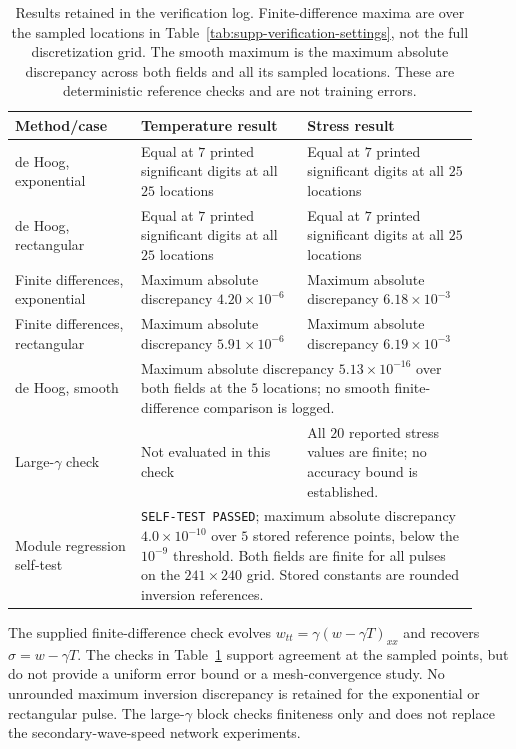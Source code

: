 \documentclass[11pt]{article}
\begin{document}
\begin{table}[htbp]
\centering
\caption{Results retained in the verification log. Finite-difference
maxima are over the sampled locations in
Table~\ref{tab:supp-verification-settings}, not the full discretization
grid. The smooth maximum is the maximum absolute discrepancy across
both fields and all its sampled locations. These are deterministic
reference checks and are not training errors.}
\label{tab:supp-verification-results}
\begin{tabular}{@{}p{0.25\linewidth}p{0.33\linewidth}p{0.34\linewidth}@{}}
\toprule
Method/case & Temperature result & Stress result\\
\midrule
de Hoog, exponential & Equal at $7$ printed significant digits at all
$25$ locations & Equal at $7$ printed significant digits at all
$25$ locations\\
de Hoog, rectangular & Equal at $7$ printed significant digits at all
$25$ locations & Equal at $7$ printed significant digits at all
$25$ locations\\
Finite differences, exponential &
Maximum absolute discrepancy $4.20\times10^{-6}$ &
Maximum absolute discrepancy $6.18\times10^{-3}$\\
Finite differences, rectangular &
Maximum absolute discrepancy $5.91\times10^{-6}$ &
Maximum absolute discrepancy $6.19\times10^{-3}$\\
de Hoog, smooth & \multicolumn{2}{p{0.69\linewidth}}{
Maximum absolute discrepancy $5.13\times10^{-16}$ over both fields
at the $5$ locations; no smooth finite-difference comparison is logged.}\\
Large-$\gamma$ check & Not evaluated in this check &
All $20$ reported stress values are finite; no accuracy bound is established.\\
Module regression self-test & \multicolumn{2}{p{0.69\linewidth}}{
\texttt{SELF-TEST PASSED}; maximum absolute discrepancy
$4.0\times10^{-10}$ over $5$ stored reference points, below the
$10^{-9}$ threshold. Both fields are finite for all pulses on the
$241\times240$ grid. Stored constants are rounded inversion references.}\\
\bottomrule
\end{tabular}
\end{table}

The supplied finite-difference check evolves
$w_{tt}=\gamma(w-\gamma T)_{xx}$ and recovers
$\sigma=w-\gamma T$. The checks in
Table~\ref{tab:supp-verification-results} support agreement at the sampled
points, but do not provide a uniform error bound or a mesh-convergence
study. No unrounded maximum inversion discrepancy is retained for the
exponential or rectangular pulse. The large-$\gamma$ block checks
finiteness only and does not replace the secondary-wave-speed network
experiments.
\end{document}
